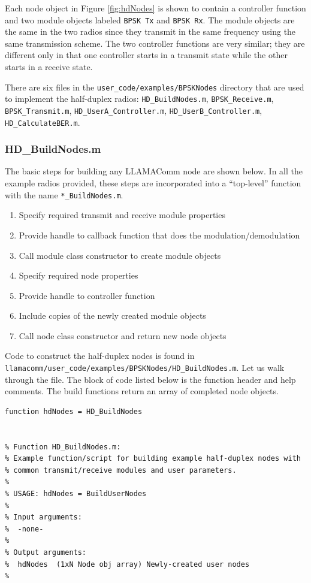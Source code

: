 Each node object in Figure \ref{fig:hdNodes} is shown to contain a
controller function and two module objects labeled \verb+BPSK Tx+
and \verb+BPSK Rx+.  The module objects are the same in the two
radios since they transmit in the same frequency using the same
transmission scheme. The two controller functions are very similar;
they are different only in that one controller starts in a transmit
state while the other starts in a receive state.

There are six files in the \verb+user_code/examples/BPSKNodes+ directory 
that are
used to implement the half-duplex radios: \verb+HD_BuildNodes.m+,
\verb+BPSK_Receive.m+, \verb+BPSK_Transmit.m+,
\verb+HD_UserA_Controller.m+, \verb+HD_UserB_Controller.m+,
\verb+HD_CalculateBER.m+.

\subsubsection{HD\_BuildNodes.m}

The basic steps for building any LLAMAComm node are shown below.  In
all the example radios provided, these steps are incorporated into a
``top-level'' function with the name \verb+*_BuildNodes.m+.

\begin{enumerate}
\item Specify required transmit and receive module properties
\item Provide handle to callback function that does the modulation/demodulation
\item Call module class constructor to create module objects
\item Specify required node properties
\item Provide handle to controller function
\item Include copies of the newly created module objects
\item Call node class constructor and return new node objects
\end{enumerate}

Code to construct the half-duplex nodes is found in
\verb+llamacomm/user_code/examples/BPSKNodes/HD_BuildNodes.m+.  
Let us walk through
the file.  The block of code listed below is the function header and
help comments. The build functions return an array of completed node
objects.

\begin{lstlisting}[name=hdBuildNodes]
function hdNodes = HD_BuildNodes


% Function HD_BuildNodes.m:
% Example function/script for building example half-duplex nodes with
% common transmit/receive modules and user parameters.
%
% USAGE: hdNodes = BuildUserNodes
%
% Input arguments:
%  -none-
%
% Output arguments:
%  hdNodes  (1xN Node obj array) Newly-created user nodes
%
\end{lstlisting}

